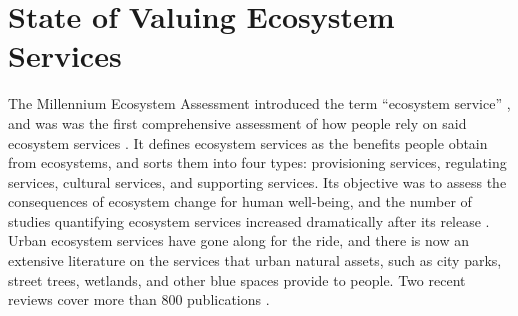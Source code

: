 \documentclass[12pt]{article}
\begin{document}
\section{State of Valuing Ecosystem Services}\label{sec:state_of_valuing}

The Millennium Ecosystem Assessment \citeyearpar{millenniumecosystemassessmentEcosystemsHumanWellbeing2005} introduced the term ``ecosystem service'' \citep{fenichelEnvironmentalEcosystemServices2025}, and was was the first comprehensive assessment of how people rely on said ecosystem services \citep{haines-youngLinksBiodiversityEcosystem2010}. It defines ecosystem services as the benefits people obtain from ecosystems, and sorts them into four types: provisioning services, regulating services, cultural services, and supporting services. Its objective was to assess the consequences of ecosystem change for human well-being, and the number of studies quantifying ecosystem services increased dramatically after its release \citep{maReviewMethodsQuantifying2025}. Urban ecosystem services have gone along for the ride, and there is now an extensive literature on the services that urban natural assets, such as city parks, street trees, wetlands, and other blue spaces provide to people. Two recent reviews cover more than 800 publications \citep{veerkampReviewStudiesAssessing2021, maReviewMethodsQuantifying2025}. 
\end{document}
